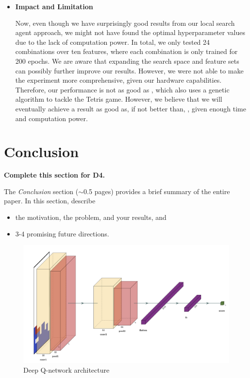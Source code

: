 \documentclass[letterpaper]{article} %
\begin{document}
\begin{itemize}
\item \textbf{Impact and Limitation}

  Now, even though we have surprisingly good results from our local search agent approach, we might not have found the optimal hyperparameter values due to the lack of computation power. In total, we only tested 24 combinations over ten features, where each combination is only trained for 200 epochs. We are aware that expanding the search space and feature sets can possibly further improve our results. However, we were not able to make the experiment more comprehensive, given our hardware capabilities. Therefore, our performance is not as good as , which also uses a genetic algorithm to tackle the Tetris game. However, we believe that we will eventually achieve a result as good as, if not better than, , given enough time and computation power.
\end{itemize}



\section{Conclusion}


{\bf Complete this section for D4.}

The {\it Conclusion} section ($\sim$0.5 pages) provides a brief summary of the entire paper.  In this section, describe 
\begin{itemize}
    \item the motivation, the problem, and your results, and
    \item 3-4 promising future directions.
\end{itemize}

\newpage






\begin{figure}[b!]
  \centering
  \includegraphics[width=0.75\linewidth]{figures/DQN.png}
  \caption{Deep Q-network architecture}
  \label{fig:DQN}
\end{figure}
\newpage
\end{document}
